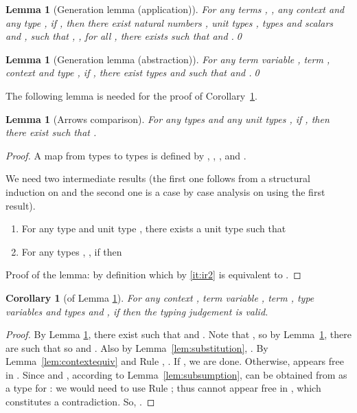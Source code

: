 \documentclass[colorlinks=true,linkcolor=black,urlcolor=black,citecolor=blue,submission,copyright,creativecommons]{eptcs}
\newtheorem{lemma}[theorem]{Lemma}
\newtheorem{corollary}[theorem]{Corollary}
\begin{document}
\begin{lemma}[Generation lemma (application)]\label{lem:genapp} For
  any terms , , any context  and any type ,
  if , then there exist natural
  numbers , unit types , types 
  and scalars  and  ,
  such that , , for all , there exists  such that
   and .\qed
\end{lemma}

\begin{lemma}[Generation lemma (abstraction)]\label{lem:genabs} For any term variable , term , context  and type , if , there exist types  and  such that  and .\qed
\end{lemma}

The following lemma is needed for the proof of Corollary~\ref{cor:genabs}.

\begin{lemma}[Arrows comparison]\label{lem:arrowcomp}
 For any types  and any unit types , if , then there exist  such that .
\end{lemma}
\begin{proof}
 A map  from types to types is defined by
, , ,  and .

We need two intermediate results (the first one follows from a structural induction on  and the second one is a case by case analysis on  using the first result).
\begin{enumerate}
 \item\label{it:ir1} For any type  and unit type , there exists a unit type  such that 
 \item\label{it:ir2} For any types , , if  then 
\end{enumerate}
Proof of the lemma: by definition  which by \ref{it:ir2} is equivalent to .
\end{proof}


\begin{corollary}[of Lemma \ref{lem:genabs}]\label{cor:genabs} For any
  context , term variable , term , type variables
   and types  and , if
   then the
  typing judgement  is valid.
\end{corollary}
\begin{proof}
  By Lemma \ref{lem:genabs}, there exist  such that  and . Note that , so by Lemma~\ref{lem:arrowcomp}, there are
   such that 
  so  and . Also by Lemma~\ref{lem:substitution},
  . By Lemma~\ref{lem:contextequiv} and Rule
  , . If , we are done. Otherwise,  appears free in . 
Since  and , according to Lemma~\ref{lem:subsumption},  can be obtained from  as a type for : we would need to use Rule ; thus  cannot appear free in , which constitutes a contradiction. So, .
\end{proof}
\end{document}
